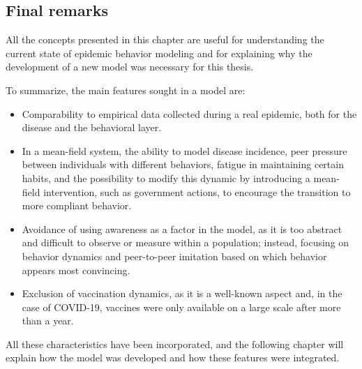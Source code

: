 \subsection{Final remarks}
All the concepts presented in this chapter are useful for understanding the current state of epidemic behavior modeling and for explaining why the development of a new model was necessary for this thesis.

To summarize, the main features sought in a model are:

\begin{itemize} 
	\item Comparability to empirical data collected during a real epidemic, both for the disease and the behavioral layer. 
	\item In a mean-field system, the ability to model disease incidence, peer pressure between individuals with different behaviors, fatigue in maintaining certain habits, and the possibility to modify this dynamic by introducing a mean-field intervention, such as government actions, to encourage the transition to more compliant behavior. 
	\item Avoidance of using awareness as a factor in the model, as it is too abstract and difficult to observe or measure within a population; instead, focusing on behavior dynamics and peer-to-peer imitation based on which behavior appears most convincing. 
	\item Exclusion of vaccination dynamics, as it is a well-known aspect and, in the case of COVID-19, vaccines were only available on a large scale after more than a year. 
\end{itemize}

All these characteristics have been incorporated, and the following chapter will explain how the model was developed and how these features were integrated.
